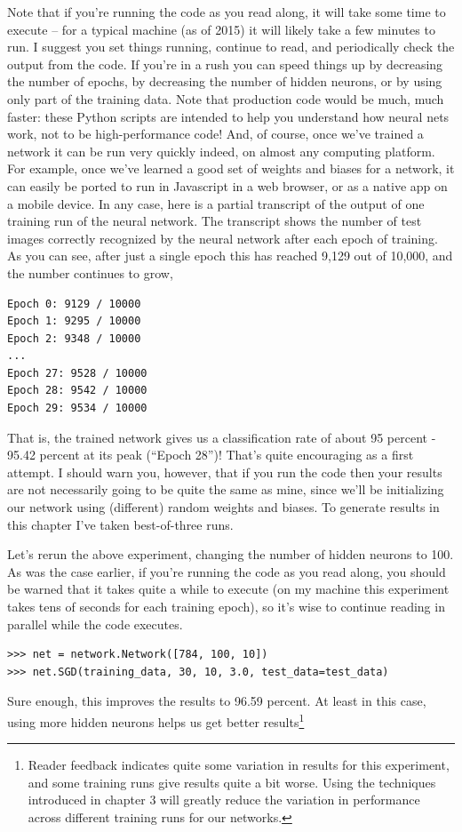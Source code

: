 \documentclass[a4paper,twoside,10pt]{book}
\begin{document}
Note that if you're running the code as you read along, it will take some time to execute -- for a typical machine (as of 2015) it will likely take a few minutes to run. I suggest you set things running, continue to read, and periodically check the output from the code. If you're in a rush you can speed things up by decreasing the number of epochs, by decreasing the number of hidden neurons, or by using only part of the training data. Note that production code would be much, much faster: these Python scripts are intended to help you understand how neural nets work, not to be high-performance code! And, of course, once we've trained a network it can be run very quickly indeed, on almost any computing platform. For example, once we've learned a good set of weights and biases for a network, it can easily be ported to run in Javascript in a web browser, or as a native app on a mobile device. In any case, here is a partial transcript of the output of one training run of the neural network. The transcript shows the number of test images correctly recognized by the neural network after each epoch of training. As you can see, after just a single epoch this has reached 9,129 out of 10,000, and the number continues to grow,
\begin{lstlisting}			
Epoch 0: 9129 / 10000
Epoch 1: 9295 / 10000
Epoch 2: 9348 / 10000
...
Epoch 27: 9528 / 10000
Epoch 28: 9542 / 10000
Epoch 29: 9534 / 10000
\end{lstlisting}
That is, the trained network gives us a classification rate of about 95 percent - 95.42 percent at its peak (``Epoch 28'')! That's quite encouraging as a first attempt. I should warn you, however, that if you run the code then your results are not necessarily going to be quite the same as mine, since we'll be initializing our network using (different) random weights and biases. To generate results in this chapter I've taken best-of-three runs.

Let's rerun the above experiment, changing the number of hidden neurons to 100. As was the case earlier, if you're running the code as you read along, you should be warned that it takes quite a while to execute (on my machine this experiment takes tens of seconds for each training epoch), so it's wise to continue reading in parallel while the code executes.
\begin{lstlisting}
>>> net = network.Network([784, 100, 10])
>>> net.SGD(training_data, 30, 10, 3.0, test_data=test_data)
\end{lstlisting}
Sure enough, this improves the results to 96.59 percent. At least in this case, using more hidden neurons helps us get better results\footnote{Reader feedback indicates quite some variation in results for this experiment, and some training runs give results quite a bit worse. Using the techniques introduced in chapter 3 will greatly reduce the variation in performance across different training runs for our networks.}
\end{document}
